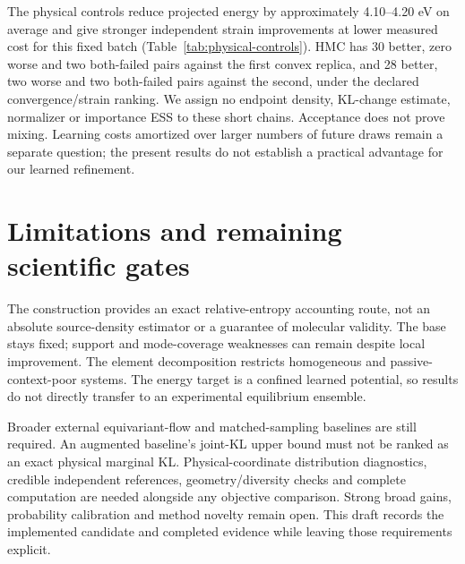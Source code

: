 The physical controls reduce projected energy by approximately 4.10--4.20 eV
on average and give stronger independent strain improvements at lower measured
cost for this fixed batch (Table~\ref{tab:physical-controls}). HMC has 30 better,
zero worse and two both-failed pairs against the first convex replica, and
28 better, two worse and two both-failed pairs against the second, under the
declared convergence/strain ranking. We assign no endpoint density, KL-change
estimate, normalizer or importance ESS to these short chains. Acceptance does
not prove mixing. Learning costs amortized over larger numbers of future draws
remain a separate question; the present results do not establish a practical
advantage for our learned refinement.

\section{Limitations and remaining scientific gates}
The construction provides an exact relative-entropy accounting route, not an
absolute source-density estimator or a guarantee of molecular validity.
The base stays fixed; support and mode-coverage weaknesses can remain despite
local improvement. The element decomposition restricts homogeneous and
passive-context-poor systems. The energy target is a confined learned potential,
so results do not directly transfer to an experimental equilibrium ensemble.

Broader external equivariant-flow and matched-sampling baselines are still required.
An augmented baseline's joint-KL upper bound must not be ranked as an exact
physical marginal KL. Physical-coordinate distribution diagnostics, credible
independent references, geometry/diversity checks and complete computation are
needed alongside any objective comparison. Strong broad gains, probability
calibration and method novelty remain open. This draft records the implemented
candidate and completed evidence while leaving those requirements explicit.
